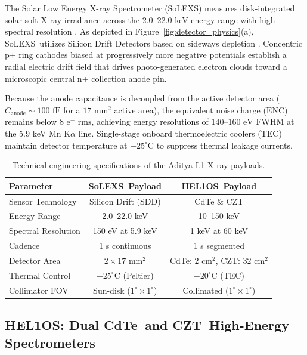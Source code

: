 \documentclass[11pt,a4paper,twocolumn]{article}
\newcommand{\solexs}{SoLEXS}
\newcommand{\helos}{HEL1OS}
\newcommand{\cdte}{CdTe}
\newcommand{\czt}{CZT}
\begin{document}
The Solar Low Energy X-ray Spectrometer (\solexs) measures disk-integrated solar soft X-ray irradiance across the 2.0--22.0 keV energy range with high spectral resolution \citep{sarwade2025solexs}. As depicted in Figure~\ref{fig:detector_physics}(a), \solexs\ utilizes Silicon Drift Detectors based on sideways depletion \citep{gatti1984}. Concentric p+ ring cathodes biased at progressively more negative potentials establish a radial electric drift field that drives photo-generated electron clouds toward a microscopic central n+ collection anode pin.

Because the anode capacitance is decoupled from the active detector area ($C_{\text{anode}} \sim 100\text{ fF}$ for a $17\text{ mm}^2$ active area), the equivalent noise charge ($\mathrm{ENC}$) remains below $8\text{ e}^-\text{ rms}$, achieving energy resolutions of $140\text{--}160\text{ eV}$ FWHM at the 5.9 keV Mn K$\alpha$ line. Single-stage onboard thermoelectric coolers (TEC) maintain detector temperature at $-25^\circ\text{C}$ to suppress thermal leakage currents.

\begin{table}[htbp]
\centering
\caption{Technical engineering specifications of the Aditya-L1 X-ray payloads.}
\label{tab:specs}
\small
\begin{tabular}{lcc}
\toprule
Parameter & \solexs\ Payload & \helos\ Payload \\
\midrule
Sensor Technology & Silicon Drift (SDD) & CdTe \& CZT \\
Energy Range & 2.0--22.0 keV & 10--150 keV \\
Spectral Resolution & 150 eV at 5.9 keV & 1 keV at 60 keV \\
Cadence & 1 s continuous & 1 s segmented \\
Detector Area & $2 \times 17\text{ mm}^2$ & CdTe: $2\text{ cm}^2$, CZT: $32\text{ cm}^2$ \\
Thermal Control & $-25^\circ\text{C}$ (Peltier) & $-20^\circ\text{C}$ (TEC) \\
Collimator FOV & Sun-disk ($1^\circ \times 1^\circ$) & Collimated ($1^\circ \times 1^\circ$) \\
\bottomrule
\end{tabular}
\end{table}

\subsection{\helos: Dual \cdte\ and \czt\ High-Energy Spectrometers}
\label{sec:hel1os_physics}
\end{document}
